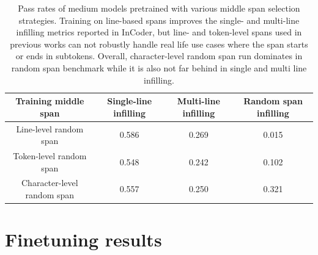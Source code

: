 \documentclass[postscript]{article}
\newcommand\Tstrut{\rule{0pt}{2.6ex}}
\begin{document}
\begin{table}[ht!]
\centering
\begin{tabular}{cccc}
\hline\Tstrut
Training middle span & Single-line infilling & Multi-line infilling & Random span infilling \\[0.1cm]
\hline\Tstrut
Line-level random span & 0.586 & 0.269 & 0.015 \\
Token-level random span & 0.548 & 0.242 & 0.102 \\
Character-level random span & 0.557 & 0.250 & 0.321 \\
\hline
\end{tabular}
\caption{Pass rates of medium models pretrained with various middle span selection strategies. Training on line-based spans improves the single- and multi-line infilling metrics reported in InCoder, but line- and token-level spans used in previous works can not robustly handle real life use cases where the span starts or ends in subtokens. Overall, character-level random span run dominates in random span benchmark while it is also not far behind in single and multi line infilling.}
\label{tab:pretraining:span-selection}
\end{table}




\section{Finetuning results}
\label{sec:finetuning}
\end{document}
